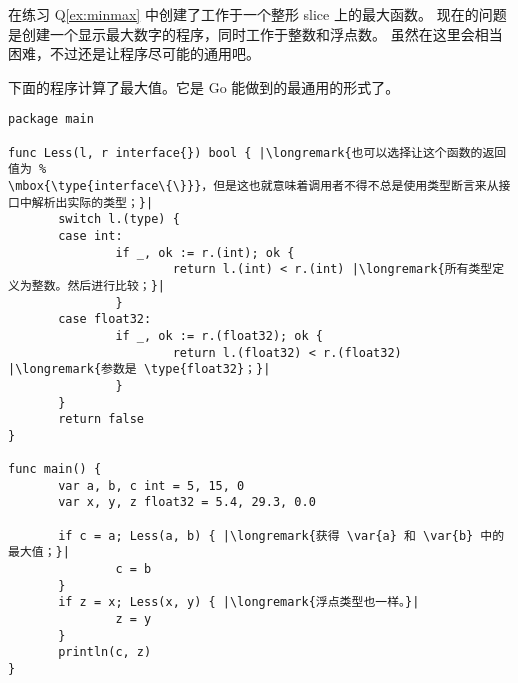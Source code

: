 \begin{Exercise}[title={接口和 max()},difficulty=7]
\Question
在练习 Q\ref{ex:minmax} 中创建了工作于一个整形 slice 上的最大函数。
现在的问题是创建一个显示最大数字的程序，同时工作于整数和浮点数。
虽然在这里会相当困难，不过还是让程序尽可能的通用吧。
\end{Exercise}

\begin{Answer}
\Question
下面的程序计算了最大值。它是 Go 能做到的最通用的形式了。

\begin{lstlisting}[caption=通用的计算最大值]
package main

func Less(l, r interface{}) bool { |\longremark{也可以选择让这个函数的返回值为 %
\mbox{\type{interface\{\}}}，但是这也就意味着调用者不得不总是使用类型断言来从接口中解析出实际的类型；}|
       switch l.(type) {
       case int:
               if _, ok := r.(int); ok {
                       return l.(int) < r.(int) |\longremark{所有类型定义为整数。然后进行比较；}|
               }
       case float32:
               if _, ok := r.(float32); ok {
                       return l.(float32) < r.(float32) |\longremark{参数是 \type{float32}；}|
               }
       }
       return false
}

func main() {
       var a, b, c int = 5, 15, 0
       var x, y, z float32 = 5.4, 29.3, 0.0

       if c = a; Less(a, b) { |\longremark{获得 \var{a} 和 \var{b} 中的最大值；}|
               c = b
       }
       if z = x; Less(x, y) { |\longremark{浮点类型也一样。}|
               z = y
       }
       println(c, z)
}
\end{lstlisting}
\showremarks
\end{Answer}

